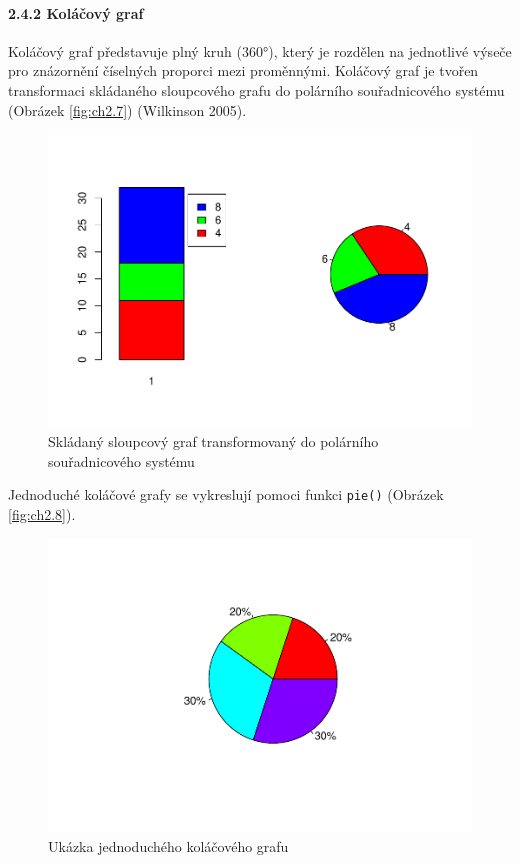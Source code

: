 \documentclass[12pt,]{article}
\let\oldparagraph\paragraph
\renewcommand{\paragraph}[1]{\oldparagraph{#1}\mbox{}}
\begin{document}
\paragraph{2.4.2 Koláčový graf}\label{kolacovy-graf}

\qquad Koláčový graf představuje plný kruh (360°), který je rozdělen na
jednotlivé výseče pro znázornění číselných proporci mezi proměnnými.
Koláčový graf je tvořen transformaci skládaného sloupcového grafu do
polárního souřadnicového systému (Obrázek \ref{fig:ch2.7}) (Wilkinson
2005).

\begin{figure}[H]

{\centering \includegraphics[width=0.65\linewidth]{BP_files/figure-latex/barplot_to_pie-1} 

}

\caption{\label{fig:ch2.7} Skládaný sloupcový graf transformovaný do polárního souřadnicového systému}\label{fig:barplot_to_pie}
\end{figure}

\qquad Jednoduché koláčové grafy se vykreslují pomoci funkci
\texttt{pie()} (Obrázek \ref{fig:ch2.8}).

\begin{figure}[H]

{\centering \includegraphics[width=0.65\linewidth]{BP_files/figure-latex/pie_example-1} 

}

\caption{\label{fig:ch2.8} Ukázka jednoduchého koláčového grafu}\label{fig:pie_example}
\end{figure}
\end{document}

